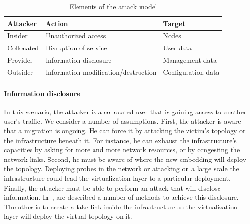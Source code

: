\begin{table}[h]
\centering
\begin{tabular}{|l|l|l|}
\hline
\textbf{Attacker}   & \textbf{Action}    & \textbf{Target}             \\ \hline
Insider    & Unauthorized access                  & Nodes              \\ \hline
Collocated & Disruption of service                & User data          \\ \hline
Provider   & Information disclosure               & Management data    \\ \hline
Outsider   & Information modification/destruction & Configuration data \\ \hline
\end{tabular}
\caption{Elements of the attack model}
\label{tab:attack-model}
\end{table}

\paragraph{Information disclosure} In this scenario, the attacker is a collocated user that is gaining access to another user's traffic. 
We consider a number of assumptions. 
First, the attacker is aware that a migration is ongoing. 
He can force it by attacking the victim's topology or the infrastructure beneath it.
For instance, he can exhaust the infrastructure's capacities by asking for more and more network resources, or by congesting the network links.
Second, he must be aware of where the new embedding will deploy the topology. 
Deploying probes in the network or attacking on a large scale the infrastructure could lead the virtualization layer to a particular deployment. 
Finally, the attacker must be able to perform an attack that will disclose information.
In~\cite{Costa2015,Sphinx-Dhawan2015}, are described a number of methods to achieve this disclosure. 
The other is to create a fake link inside the infrastructure so the virtualization layer will deploy the virtual topology on it. 

